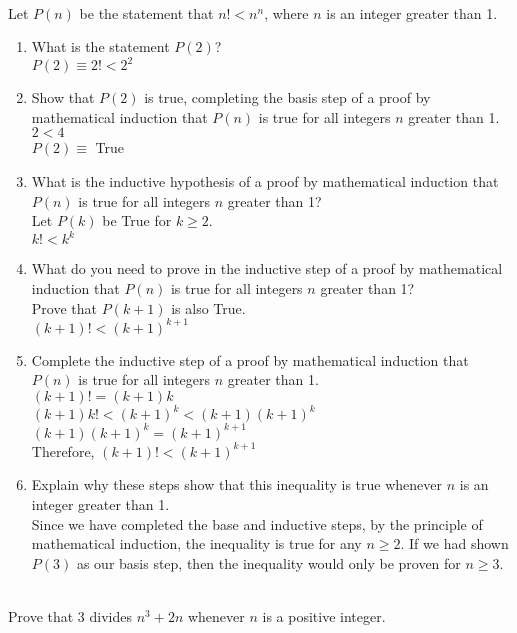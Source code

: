 \documentclass[12pt]{article}  %
\begin{document}
\clearpage
{}\\
Let $P(n)$ be the statement that $n!<n^n$, where $n$ is an integer greater than 1.
\begin{enumerate}
    \item What is the statement $P(2)$?\\
    $P(2)\equiv2!<2^2$
    
    \item Show that $P(2)$ is true, completing the basis step of a proof by mathematical induction that $P(n)$ is true for all integers $n$ greater than 1.\\
    $2<4$\\
    $P(2)\equiv$ True
    
    \item What is the inductive hypothesis of a proof by mathematical induction that $P(n)$ is true for all integers $n$ greater than 1?\\
    Let $P(k)$ be True for $k\geq2$.\\
    $k!<k^k$
    
    \item What do you need to prove in the inductive step of a proof by mathematical induction that $P(n)$ is true for all integers $n$ greater than 1?\\
    Prove that $P(k+1)$ is also True.\\
    $(k+1)!<(k+1)^{k+1}$
    
    \item Complete the inductive step of a proof by mathematical induction that $P(n)$ is true for all integers $n$ greater than 1.\\
    $(k+1)!=(k+1)k$\\
    $(k+1)k!<(k+1)^k<(k+1)(k+1)^k$\\
    $(k+1)(k+1)^k=(k+1)^{k+1}$\\
    Therefore, $(k+1)!<(k+1)^{k+1}$
    
    \item Explain why these steps show that this inequality is true whenever $n$ is an integer greater than 1.\\
    Since we have completed the base and inductive steps, by the principle of mathematical induction, the inequality is true for any $n\geq2$. If we had shown $P(3)$ as our basis step, then the inequality would only be proven for $n\geq3$.
\end{enumerate}

\clearpage
{}\\
Prove that 3 divides $n^3+2n$ whenever $n$ is a positive integer.
\end{document}
